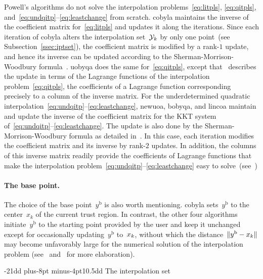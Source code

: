 \documentclass[
    smallextended,  %
    final,          %
]{svjour3}
\makeatletter
\newcommand{\base}{{\text{b}}}
\newcommand{\iter}[1][k]{x\ifthenelse{\equal{#1}{}}{}{_{#1}}}
\newcommand{\xpt}[1][k]{\mathcal{Y}\ifthenelse{\equal{#1}{}}{}{_{#1}}}
\def\subsubsection{\@startsection{subsubsection}{2}{\z@}%
    {-21dd plus-8pt minus-4pt}{10.5dd}
     {\normalsize\bfseries}}
\makeatother
\begin{document}
Powell's algorithms do not solve the interpolation problems~\eqref{eq:litpls}, \eqref{eq:qitpls},
and~\mbox{\eqref{eq:undqitp}--\eqref{eq:leastchange}} from scratch.
\gls{cobyla} maintains the inverse of the coefficient matrix for~\eqref{eq:litpls}
and updates it along the iterations.
Since each iteration of \gls{cobyla} alters the interpolation set~$\xpt$ by only one
point~(see Subsection~\ref{ssec:iptset}), the coefficient matrix is modified by a rank-$1$ update, and hence
its inverse can be updated according to the Sherman-Morrison-Woodbury formula~\cite{Hager_1989}.
\gls{uobyqa} does the same for~\eqref{eq:qitpls},
except that~\cite[\S~4]{Powell_2002} describes the update in terms of the Lagrange functions of the
interpolation problem~\eqref{eq:qitpls}, the coefficients of a Lagrange function corresponding
precisely to a column of the inverse matrix.
For the underdetermined quadratic interpolation~\mbox{\eqref{eq:undqitp}--\eqref{eq:leastchange}},
\gls{newuoa}, \gls{bobyqa}, and \gls{lincoa}
maintain and update the inverse of the coefficient matrix for the KKT system
of~\mbox{\eqref{eq:undqitp}--\eqref{eq:leastchange}}. The update is also done by the
Sherman-Morrison-Woodbury formula as detailed in~\cite[\S~2]{Powell_2004c}. In this case, each
iteration modifies the coefficient matrix and its inverse by rank-$2$ updates.
In addition, the columns of this inverse matrix readily provide the coefficients of Lagrange
functions that make the interpolation problem~\mbox{\eqref{eq:undqitp}--\eqref{eq:leastchange}}
easy to solve~(see~\mbox{\cite[\S~3]{Powell_2004b}})


\paragraph{\textnormal{\textbf{The base point.}}}

The choice of the base point~$y^{\base}$ is also worth mentioning.
\Gls{cobyla} sets~$y^{\base}$ to the center~$x_k$ of the current trust region.
In contrast, the other four algorithms initiate~$y^{\base}$ to the starting point provided by the
user and keep it unchanged except for occasionally updating~$y^{\base}$ to~$\iter$, without which
the distance~$\|y^{\base}-\iter\|$ may become unfavorably large for the numerical solution of the
interpolation problem (see~\cite[\S~5]{Powell_2004b} and~\cite[\S~7]{Powell_2006} for more elaboration).

\subsubsection{The interpolation set}
\label{ssec:iptset}
\end{document}
